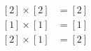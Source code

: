 \documentclass[preview]{standalone}
\begin{document}
\begin{align*}
\begin{aligned}\left[2\right] \times \left[2\right] &= \left[2\right] \\\left[1\right] \times \left[1\right] &= \left[1\right] \\\left[2\right] \times \left[1\right] &= \left[2\right]\end{aligned}
\end{align*}
\end{document}
